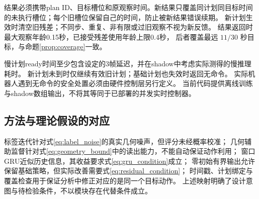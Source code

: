 结果必须携带plan ID、目标槽位和原观察时间。新结果只覆盖同计划同目标时间
的未执行槽位；每个旧槽位保留自己的时间，防止被新结果错误续期。
新计划生效时清空旧残差；不同步、重复、非有限或过旧观察不视为新反馈。
结果返回时最大观察年龄0.15秒，已接受残差使用年龄上限0.4秒，
后者覆盖最远 $11/30$ 秒目标，与命题\ref{prop:coverage}一致。

慢计划ready时间至少包含设定的3帧延迟，并在shadow中考虑实际测得的慢推理耗时。
新计划未到时仅继续有效旧计划；基础计划也失效时返回无命令。
实际机器人遇到无命令的安全处置必须由硬件控制层另行定义。
当前代码提供离线训练与shadow数组输出，不将其等同于已部署的并发实时控制器。

\subsection{方法与理论假设的对应}

标签迭代针对式\eqref{eq:label_noise}的真实几何噪声，但评分未经概率校准；
几何辅助监督针对式\eqref{eq:geometry_bound}中的读出能力，不能自动保证动作利用；
窗口GRU近似历史信息，其收益要求式\eqref{eq:gru_condition}成立；
零初始有界输出允许保留基础策略，但实际改善需要式\eqref{eq:residual_condition}；
时间戳、计划绑定与覆盖检查用于保证分析中修正对应的是同一个目标动作。
上述映射明确了设计意图与待检验条件，不以模块存在代替条件成立。
